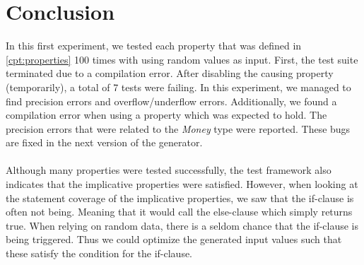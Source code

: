 \section{Conclusion}
In this first experiment, we tested each property that was defined in
\autoref{cpt:properties} 100 times with using random values as input. First, the
test suite terminated due to a compilation error. After disabling the causing
property (temporarily), a total of 7 tests were failing. In this experiment, we
managed to find precision errors and overflow/underflow errors. Additionally, we
found a compilation error when using a property which was expected to hold. The
precision errors that were related to the \textit{Money} type were reported.
These bugs are fixed in the next version of the generator.\\
\\
Although many properties were tested successfully, the test framework also
indicates that the implicative properties were satisfied. However, when looking
at the statement coverage of the implicative properties, we saw that the
if-clause is often not being. Meaning that it would call the else-clause which
simply returns true. When relying on random data, there is a seldom chance that
the if-clause is being triggered. Thus we could optimize the generated input
values such that these satisfy the condition for the if-clause.


